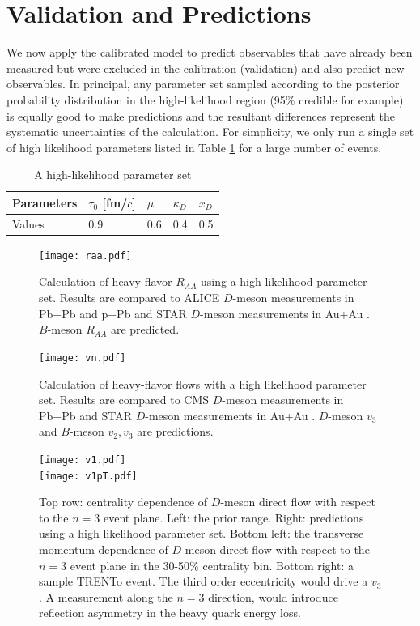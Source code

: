 \documentclass[aps, prc, reprint, amsmath, groupedaddress, nofootinbib]{revtex4-1}
\begin{document}
\section{Validation and Predictions}\label{section:prediction}
We now apply the calibrated model to predict observables that have already been measured but were excluded in the calibration (validation) and also predict new observables.
In principal, any parameter set sampled according to the posterior probability distribution in the high-likelihood region (95\% credible for example) is equally good to make predictions and the resultant differences represent the systematic uncertainties of the calculation.
For simplicity, we only run a single set of high likelihood parameters listed in Table \ref{table:high-likelihood-parameters} for a large number of events.
\begin{table}
\caption{A high-likelihood parameter set}\label{table:high-likelihood-parameters}
\begin{tabularx}{\columnwidth}{XXXXX}
\hline
Parameters & $\tau_0$ [fm/$c$] & $\mu$ & $\kappa_D$ & $x_D$   \\
\hline
Values & 0.9 & 0.6 & 0.4 & 0.5\\
\hline
\end{tabularx}
\end{table} 
\begin{figure}
\texttt{[image: raa.pdf]}
\caption{Calculation of heavy-flavor $R_{AA}$ using a high likelihood parameter set. Results are compared to ALICE $D$-meson measurements in Pb+Pb and p+Pb \cite{Abelev:2014hha,Abelev:2014hha} and STAR $D$-meson measurements in Au+Au \cite{Xie:2016iwq}. $B$-meson $R_{AA}$ are predicted.}\label{plots:pred:raa}
\end{figure}
\begin{figure}
\texttt{[image: vn.pdf]}
\caption{Calculation of heavy-flavor flows with a high likelihood parameter set. Results are compared to CMS $D$-meson measurements in Pb+Pb \cite{Sirunyan:2017plt} and STAR $D$-meson measurements in Au+Au \cite{Adamczyk:2017xur}. $D$-meson $v_3$ and $B$-meson $v_2, v_3$ are predictions.}\label{plots:pred:vn}
\end{figure}
\begin{figure}
\texttt{[image: v1.pdf]}\\
\texttt{[image: v1pT.pdf]}
\caption{Top row: centrality dependence of $D$-meson direct flow with respect to the $n=3$ event plane. Left: the prior range. Right: predictions using a high likelihood parameter set. Bottom left: the transverse momentum dependence of $D$-meson direct flow with respect to the $n=3$ event plane in the 30-50\% centrality bin. Bottom right: a sample TRENTo event. The third order eccentricity would drive a $v_3$. A measurement along the $n=3$ direction, would introduce reflection asymmetry in the heavy quark energy loss.}\label{plots:pred:v1}
\end{figure}
\end{document}
